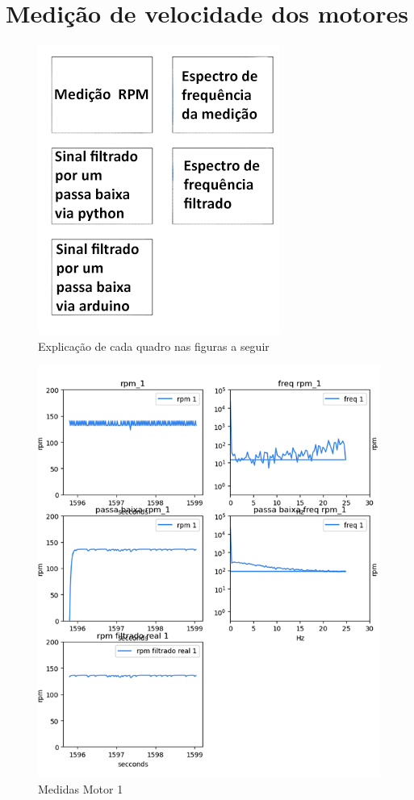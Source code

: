 \chapter{Medição de velocidade dos motores}
\label{att_medicao_motores}

\begin{figure}[ht]
	\centering
	\includegraphics{figures/explicacao_quadros}
	\caption{Explicação de cada quadro nas figuras a seguir}
	\label{fig:explicacao_quadros}
\end{figure}


\begin{figure}[ht]
	\centering
	\includegraphics{figures/medidas_motor_1}
	\caption{Medidas Motor 1}
	\label{fig:medidas_motor_1}
\end{figure}

